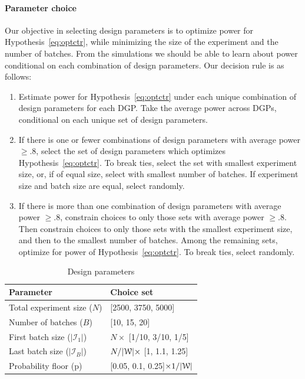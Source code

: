 \documentclass[letterpaper, 12pt, parskip=full,]{scrartcl}
\begin{document}
\paragraph{Parameter choice}
Our objective in selecting design parameters is to optimize power for Hypothesis~\ref{eq:optctr}, while minimizing the size of the experiment and the number of batches. From the simulations we should be able to learn about power conditional on each combination of design parameters. Our decision rule is as follows:
\begin{enumerate}
\item Estimate power for Hypothesis~\ref{eq:optctr} under each unique combination of design parameters for each DGP. Take the average power across DGPs, conditional on each unique set of design parameters. 
\item If there is one or fewer combinations of design parameters with average power $\ge.8$, select the set of design parameters which optimizes Hypothesis~\ref{eq:optctr}. To break ties, select the set with smallest experiment size, or, if of equal size, select with smallest number of batches. If experiment size and batch size are equal, select randomly. 
\item If there is more than one combination of design parameters with average power $\ge.8$, constrain choices to only those sets with average power $\ge.8$. Then constrain choices to only those sets with the smallest experiment size, and then to the smallest number of batches. Among the remaining sets, optimize for power of Hypothesis~\ref{eq:optctr}. To break ties, select randomly. 
\end{enumerate}

\begin{table}[H]
\centering
\caption{Design parameters} 
\label{tab:design}
\begin{tabular}{l | l}
\textbf{Parameter} & \textbf{Choice set} \\ \hline
Total experiment size ($N$)& [2500, 3750, 5000] \\
Number of batches ($B$)& [10, 15, 20] \\
First batch size ($|\mathcal{I}_1|$) & $N \times$ [1/10, 3/10, 1/5] \\
Last batch size ($|\mathcal{I}_B|$) & $N/ |{\EuScript W}| \times$ [1, 1.1, 1.25] \\
Probability floor (p)& [0.05, 0.1, 0.25]$\times 1/ |{\EuScript W}|$ \\
\hline
\end{tabular}
\end{table}
\end{document}
